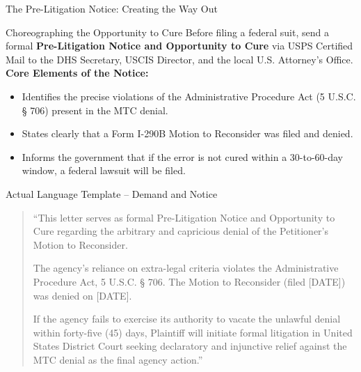 \documentclass[11pt]{beamer}
\begin{document}
	\begin{frame}[allowframebreaks]{The Pre-Litigation Notice: Creating the Way Out}
		\scriptsize
		\begin{block}{Choreographing the Opportunity to Cure}
			Before filing a federal suit, send a formal \textbf{Pre-Litigation Notice and Opportunity to Cure} via USPS Certified Mail to the DHS Secretary, USCIS Director, and the local U.S. Attorney's Office.
			\vspace{0.15cm}
			\textbf{Core Elements of the Notice:}
			\begin{itemize}
				\item Identifies the precise violations of the Administrative Procedure Act (5 U.S.C. § 706) present in the MTC denial.
				\item States clearly that a Form I-290B Motion to Reconsider was filed and denied.
				\item Informs the government that if the error is not cured within a 30-to-60-day window, a federal lawsuit will be filed.
			\end{itemize}
		\end{block}
		\framebreak
		\begin{block}{Actual Language Template -- Demand and Notice}
			\begin{quote}
				``This letter serves as formal Pre-Litigation Notice and Opportunity to Cure regarding the arbitrary and capricious denial of the Petitioner's Motion to Reconsider. 
				
				The agency's reliance on extra-legal criteria violates the Administrative Procedure Act, 5 U.S.C. § 706. The Motion to Reconsider (filed [DATE]) was denied on [DATE]. 
				
				If the agency fails to exercise its authority to vacate the unlawful denial within forty-five (45) days, Plaintiff will initiate formal litigation in United States District Court seeking declaratory and injunctive relief against the MTC denial as the final agency action.''
			\end{quote}
		\end{block}
	\end{frame}
	
	
\end{document}
